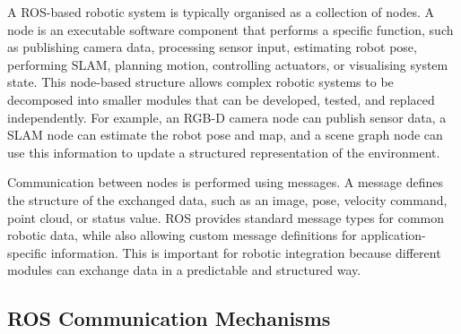 {\small

A ROS-based robotic system is typically organised as a collection of nodes. A node is an executable software component that performs a specific function, such as publishing camera data, processing sensor input, estimating robot pose, performing SLAM, planning motion, controlling actuators, or visualising system state. This node-based structure allows complex robotic systems to be decomposed into smaller modules that can be developed, tested, and replaced independently. For example, an RGB-D camera node can publish sensor data, a SLAM node can estimate the robot pose and map, and a scene graph node can use this information to update a structured representation of the environment.

Communication between nodes is performed using messages. A message defines the structure of the exchanged data, such as an image, pose, velocity command, point cloud, or status value. ROS provides standard message types for common robotic data, while also allowing custom message definitions for application-specific information. This is important for robotic integration because different modules can exchange data in a predictable and structured way.

}

\subsection{ROS Communication Mechanisms}

